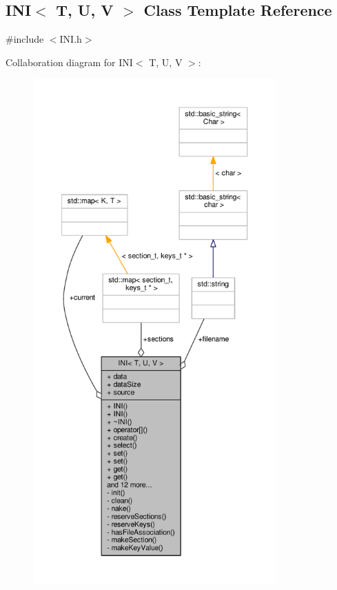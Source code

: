 \subsection{I\+NI$<$ T, U, V $>$ Class Template Reference}
\label{classINI}


{\ttfamily \#include $<$I\+N\+I.\+h$>$}



Collaboration diagram for I\+NI$<$ T, U, V $>$\+:
\nopagebreak
\begin{figure}[H]
\begin{center}
\leavevmode
\includegraphics[height=550pt]{de/da2/classINI__coll__graph}
\end{center}
\end{figure}
